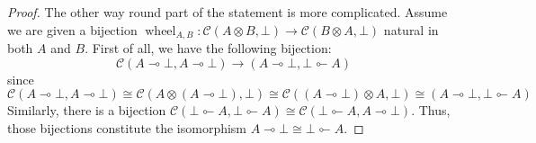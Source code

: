 \documentclass[8pt]{article}
\theoremstyle{definition}
\theoremstyle{definition}
\theoremstyle{definition}
\theoremstyle{definition}
\theoremstyle{definition}
\theoremstyle{definition}
\theoremstyle{definition}
\theoremstyle{definition}
\theoremstyle{definition}
\theoremstyle{definition}
\theoremstyle{definition}
\theoremstyle{definition}
\theoremstyle{definition}
\theoremstyle{definition}
\theoremstyle{question}
\begin{document}
\begin{proof}
  The other way round part of the statement is more complicated.
  Assume we are given a bijection $\operatorname{wheel}_{A,B} : \mathcal{C}(A \otimes B, \bot) \to 
  \mathcal{C}(B \otimes A, \bot)$ natural in both $A$ and $B$. First of all, we have the following bijection:
  \[
  \mathcal{C}(A \multimap \bot, A \multimap \bot) \to (A \multimap \bot, \bot \multimapinv A)
  \]
  since 
  \[ \mathcal{C}(A \multimap \bot, A \multimap \bot) \cong \mathcal{C}(A \otimes (A \multimap \bot), \bot) \cong \mathcal{C}((A \multimap \bot) \otimes A, \bot) \cong (A \multimap \bot, \bot \multimapinv A)
  \]
  Similarly, there is a bijection $\mathcal{C}(\bot \multimapinv A, \bot \multimapinv A) \cong \mathcal{C}(\bot \multimapinv A, A \multimap \bot)$.
  Thus, those bijections constitute the isomorphism $A \multimap \bot \cong \bot \multimapinv A$.
\end{proof}
\end{document}
